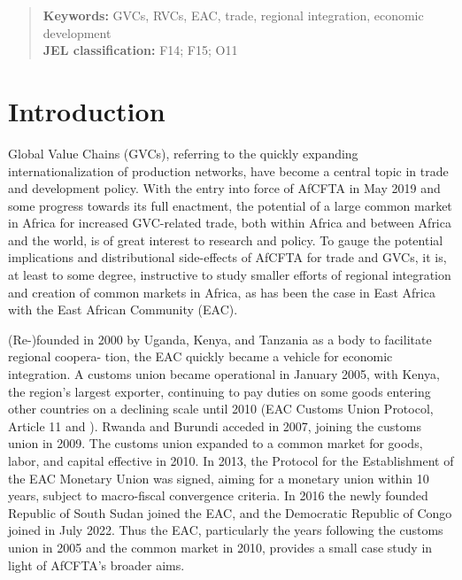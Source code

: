 \documentclass[a4paper]{article}
\begin{document}
\begin{abstract}
\noindent \textbf{Keywords:} GVCs, RVCs, EAC, trade, regional integration, economic development\\
\textbf{JEL classification:} F14; F15; O11
\end{abstract}



\section{Introduction}

Global Value Chains (GVCs), referring to the quickly expanding internationalization of production networks, have become a central topic in trade and development policy. With the entry into force of AfCFTA in May 2019 and some progress towards its full enactment, the potential of a large common market in Africa for increased GVC-related trade, both within Africa and between Africa and the world, is of great interest to research and policy. To gauge the potential implications and distributional side-effects of AfCFTA for trade and GVCs, it is, at least to some degree, instructive to study smaller efforts of regional integration and creation of common markets in Africa, as has been the case in East Africa with the East African Community (EAC). \newline 

(Re-)founded in 2000 by Uganda, Kenya, and Tanzania as a body to facilitate regional coopera-
tion, the EAC quickly became a vehicle for economic integration. A customs union became operational in January 2005, with Kenya, the region's largest exporter, continuing to pay duties on some goods entering other countries on a declining scale until 2010 (EAC Customs Union Protocol, Article 11 and \citet{aloo2017free}). Rwanda and Burundi acceded in 2007, joining the customs union in 2009. The customs union expanded to a common market for goods, labor, and capital effective in 2010. In 2013, the Protocol for the Establishment of the EAC Monetary Union was signed, aiming for a monetary union within 10 years, subject to macro-fiscal convergence criteria. In 2016 the newly founded Republic of South Sudan joined the EAC, and the Democratic Republic of Congo joined in July 2022. Thus the EAC, particularly the years following the customs union in 2005 and the common market in 2010, provides a small case study in light of AfCFTA's broader aims. \newline 
\end{document}
